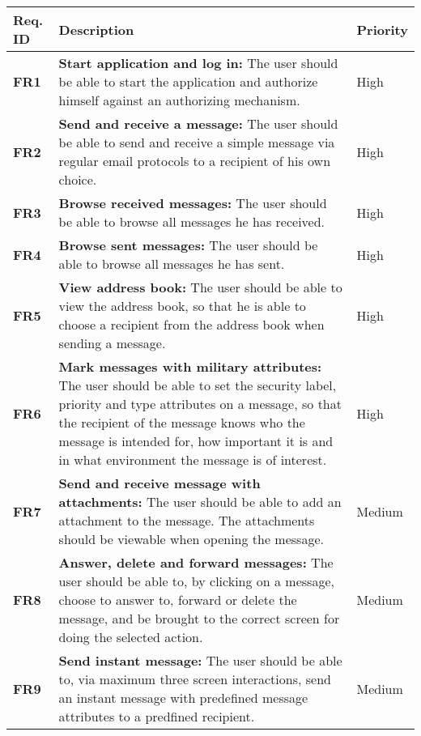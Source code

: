 
\begin{longtable}{>{\setlength\hsize{.3\hsize}}X|>{\setlength\hsize{0.9\hsize}}X|>{\setlength\hsize{.3\hsize}}X}\hline
\textbf{Req. ID} & \textbf{Description} & \textbf{Priority} \\ \hline \hline

\textbf{FR1} & \textbf{Start application and log in:} The user should be able to start the application and authorize himself against an authorizing mechanism. & High \\ \hline

\textbf{FR2} & \textbf{Send and receive a message:} The user should be able to send and receive a simple message via regular email protocols to a recipient of his own choice. & High \\ \hline

\textbf{FR3} & \textbf{Browse received messages:} The user should be able to browse all messages he has received. & High \\ \hline

\textbf{FR4} & \textbf{Browse sent messages:} The user should be able to browse all messages he has sent.& High \\ \hline

\textbf{FR5} & \textbf{View address book:} The user should be able to view the address book, so that he is able to choose a recipient from the address book when sending a message. & High \\ \hline

\textbf{FR6} & \textbf{Mark messages with military attributes:} The user should be able to set the security label, priority and type attributes on a message, so that the recipient of the message knows who the message is intended for, how important it is and in what environment the message is of interest. & High \\ \hline

\textbf{FR7} & \textbf{Send and receive message with attachments:} The user should be able to add an attachment to the message. The attachments should be viewable when opening the message. & Medium \\ \hline

\textbf{FR8} & \textbf{Answer, delete and forward messages:} The user should be able to, by clicking on a message, choose to answer to, forward or delete the message, and be brought to the correct screen for doing the selected action. & Medium \\ \hline

\textbf{FR9} & \textbf{Send instant message:} The user should be able to, via maximum three screen interactions, send an instant message with predefined message attributes to a predfined recipient. & Medium \\ \hline


\end{longtable}
